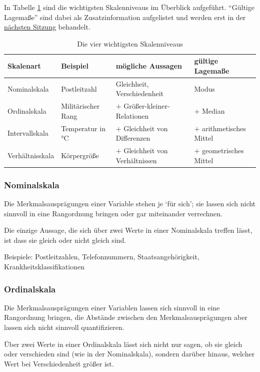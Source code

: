 \documentclass[
  11pt,
  ngerman,
  a4paper,
]{report}
\begin{document}
In Tabelle \ref{tab:skalen} sind die wichtigsten Skalenniveaus im Überblick aufgeführt. \enquote{Gültige Lagemaße} sind dabei als Zusatzinformation aufgelistet und werden erst in der \protect\hyperlink{lagemauxdfe}{nächsten Sitzung} behandelt.

\begin{table}

\caption{\label{tab:skalen}Die vier wichtigsten Skalenniveaus}
\centering
\begin{tabular}[t]{llll}
\toprule
Skalenart & Beispiel & mögliche Aussagen & gültige Lagemaße\\
\midrule
Nominalskala & Postleitzahl & Gleichheit, Verschiedenheit & Modus\\
Ordinalskala & Militärischer Rang & $+$ Größer-kleiner-Relationen & $+$ Median\\
Intervallskala & Temperatur in °C & $+$ Gleichheit von Differenzen & $+$ arithmetisches Mittel\\
Verhältnisskala & Körpergröße & $+$ Gleichheit von Verhältnissen & $+$ geometrisches Mittel\\
\bottomrule
\end{tabular}
\end{table}

\hypertarget{nominalskala}{%
\subsubsection{Nominalskala}\label{nominalskala}}

Die Merkmalsausprägungen einer Variable stehen je \enquote*{für sich}; sie lassen sich nicht sinnvoll in eine Rangordnung bringen oder gar miteinander verrechnen.

Die einzige Aussage, die sich über zwei Werte in einer Nominalskala treffen lässt, ist dass sie gleich oder nicht gleich sind.

Beispiele: Postleitzahlen, Telefonnummern, Staatsangehörigkeit, Krankheitsklassifikationen

\hypertarget{ordinalskala}{%
\subsubsection{Ordinalskala}\label{ordinalskala}}

Die Merkmalsausprägungen einer Variablen lassen sich sinnvoll in eine Rangordnung bringen, die Abstände zwischen den Merkmalsausprägungen aber lassen sich nicht sinnvoll quantifizieren.

Über zwei Werte in einer Ordinalskala lässt sich nicht nur sagen, ob sie gleich oder verschieden sind (wie in der Nominalskala), sondern darüber hinaus, welcher Wert bei Verschiedenheit größer ist.
\end{document}
